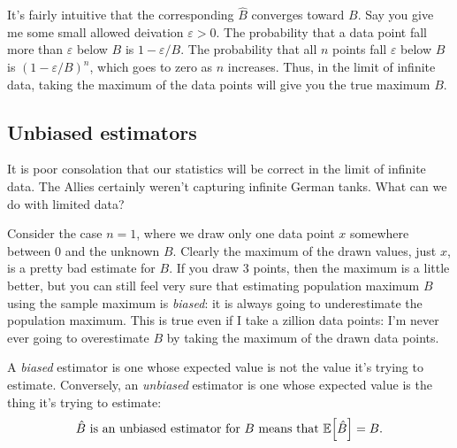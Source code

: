 It's fairly intuitive that the corresponding $\hat{B}$ converges toward $B$.
Say you give me some small allowed deivation $\varepsilon > 0$. The probability
that a data point fall more than $\varepsilon$ below $B$ is $1 -
\varepsilon/B$. The probability that all $n$ points fall $\varepsilon$ below
$B$ is $(1 - \varepsilon/B)^n$, which goes to zero as $n$ increases. Thus, in
the limit of infinite data, taking the maximum of the data points will give you
the true maximum $B$.

\subsection{Unbiased estimators}

It is poor consolation that our statistics will be correct in the limit of
infinite data. The Allies certainly weren't capturing infinite German tanks.
What can we do with limited data?

Consider the case $n=1$, where we draw only one data point $x$ somewhere
between 0 and the unknown $B$. Clearly the maximum of the drawn values, just
$x$, is a pretty bad estimate for $B$.  If you draw 3 points, then the maximum
is a little better, but you can still feel very sure that estimating population
maximum $B$ using the sample maximum is \emph{biased}: it is always going to
underestimate the population maximum. This is true even if I take a zillion
data points: I'm never ever going to overestimate $B$ by taking the maximum of
the drawn data points.

A \emph{biased} estimator is one whose expected value is not the
value it's trying to estimate. Conversely, an \emph{unbiased} estimator is
one whose expected value is the thing it's trying to estimate:
\begin{equation}
\text{$\hat{B}$ is an unbiased estimator for $B$ means that } \mathbb{E}\!\left[{\hat{B}}\right] = B.
\end{equation}

